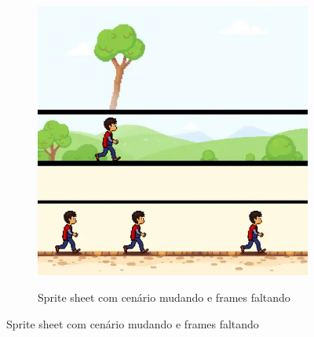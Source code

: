 \begin{figure}[htbp]
    \centering
    \caption{\small Resultados finais}
    \label{fig:rosebudResultadosFinais}
    \begin{subfigure}{0.45\textwidth}
    \caption{\small Sprite sheet com cenário mudando e frames faltando}
    \includegraphics[width=1\linewidth]{figs/rosebud/rosebud_resultado_tela7.PNG}
    \label{fig:rosebudSpriteSheetFrameFaltando}


\end{subfigure}
\end{figure}
